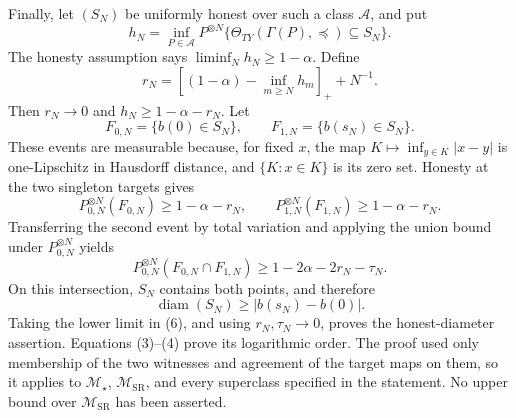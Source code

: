 Finally, let \((S_N)\) be uniformly honest over such a class \(\mathcal A\), and put
\[
 h_N=\inf_{P\in\mathcal A}P^{\otimes N}
 \{\Theta_{TY}(\Gamma(P),\preceq)\subseteq S_N\}.
\]
The honesty assumption says \(\liminf_Nh_N\ge1-\alpha\).  Define
\[
 r_N=\left[(1-\alpha)-\inf_{m\ge N}h_m\right]_++N^{-1}.
\]
Then \(r_N\to0\) and \(h_N\ge1-\alpha-r_N\).  Let
\[
 F_{0,N}=\{b(0)\in S_N\},\qquad
 F_{1,N}=\{b(s_N)\in S_N\}.
\]
These events are measurable because, for fixed \(x\), the map \(K\mapsto\inf_{y\in K}|x-y|\) is one-Lipschitz in Hausdorff distance, and \(\{K:x\in K\}\) is its zero set.  Honesty at the two singleton targets gives
\[
 P_{0,N}^{\otimes N}(F_{0,N})\ge1-\alpha-r_N,
 \qquad
 P_{1,N}^{\otimes N}(F_{1,N})\ge1-\alpha-r_N.
\]
Transferring the second event by total variation and applying the union bound under \(P_{0,N}^{\otimes N}\) yields
\[
 P_{0,N}^{\otimes N}(F_{0,N}\cap F_{1,N})
 \ge1-2\alpha-2r_N-\tau_N. \tag{6}
\]
On this intersection, \(S_N\) contains both points, and therefore
\[
 \operatorname{diam}(S_N)\ge|b(s_N)-b(0)|.
\]
Taking the lower limit in (6), and using \(r_N,\tau_N\to0\), proves the honest-diameter assertion.  Equations (3)--(4) prove its logarithmic order.  The proof used only membership of the two witnesses and agreement of the target maps on them, so it applies to \(\mathcal M_\star\), \(\mathcal M_{\mathrm{SR}}\), and every superclass specified in the statement.  No upper bound over \(\mathcal M_{\mathrm{SR}}\) has been asserted.
